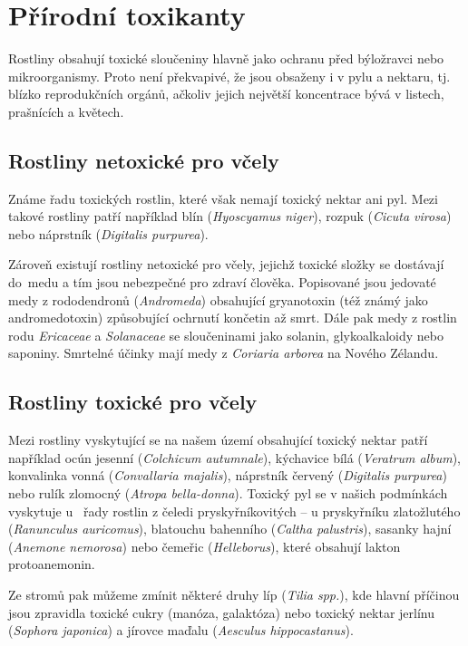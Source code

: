 \documentclass[openany, oneside, a4paper, 12pt, final]{memoir}
\begin{document}
\section{Přírodní toxikanty}
Rostliny obsahují toxické sloučeniny hlavně jako ochranu před býložravci nebo mikroorganismy. Proto není překvapivé, že jsou obsaženy i v pylu a nektaru, tj. blízko reprodukčních orgánů, ačkoliv jejich největší koncentrace bývá v listech, prašnících a květech.

\subsection{Rostliny netoxické pro včely}
Známe řadu toxických rostlin, které však nemají toxický nektar ani pyl. Mezi takové rostliny patří například blín (\textit{Hyoscyamus niger}), rozpuk (\textit{Cicuta virosa}) nebo náprstník (\textit{Digitalis purpurea}).


Zároveň existují rostliny netoxické pro včely, jejichž toxické složky se dostávají do~medu a tím jsou nebezpečné pro zdraví člověka. Popisované jsou jedovaté medy z rododendronů (\textit{Andromeda}) obsahující gryanotoxin (též známý jako andromedotoxin) způsobující ochrnutí končetin až smrt. Dále pak medy z rostlin rodu \textit{Ericaceae} a \textit{Solanaceae} se sloučeninami jako solanin, glykoalkaloidy nebo saponiny. Smrtelné účinky mají medy z \textit{Coriaria arborea} na Nového Zélandu. \cite{islam2014toxic,vcelarstviTomsik}

\subsection{Rostliny toxické pro včely}

Mezi rostliny vyskytující se na našem území obsahující toxický nektar patří například ocún jesenní (\textit{Colchicum autumnale}), kýchavice bílá (\textit{Veratrum album}), konvalinka vonná (\textit{Convallaria majalis}), náprstník červený (\textit{Digitalis purpurea}) nebo rulík zlomocný (\textit{Atropa bella-donna}).
Toxický pyl se v našich podmínkách vyskytuje u~ řady rostlin z čeledi pryskyřníkovitých -- u pryskyřníku zlatožlutého (\textit{Ranunculus auricomus}), blatouchu bahenního (\textit{Caltha palustris}), sasanky hajní (\textit{Anemone nemorosa}) nebo čemeřic (\textit{Helleborus}), které obsahují lakton protoanemonin. 


Ze stromů pak můžeme zmínit některé druhy líp (\textit{Tilia spp.}), kde hlavní příčinou jsou zpravidla toxické cukry (manóza, galaktóza) nebo toxický nektar jerlínu (\textit{Sophora japonica}) a jírovce maďalu (\textit{Aesculus hippocastanus}). \cite{vcelarstviVeselý,vcelarstviTomsik,Botany,Detzel1993}
\end{document}
